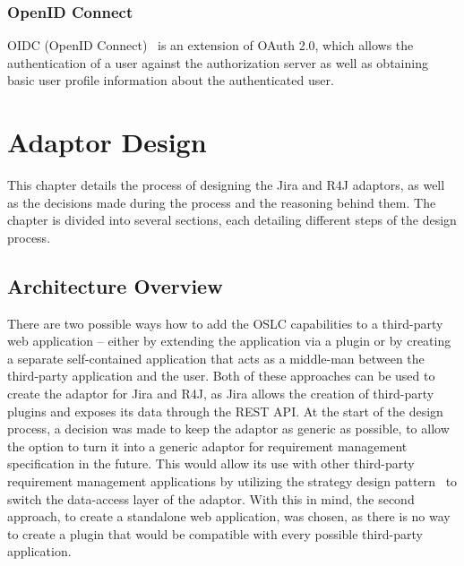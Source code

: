 \subsection*{OpenID Connect}
OIDC (OpenID Connect) \cite{oidc} is an extension of OAuth 2.0, which allows the authentication of a user against the authorization server as well as obtaining basic user profile information about the authenticated user.


\chapter{Adaptor Design}
This chapter details the process of designing the Jira and R4J adaptors, as well as the decisions made during the process and the reasoning behind them. The chapter is divided into several sections, each detailing different steps of the design process.

\section{Architecture Overview}
There are two possible ways how to add the OSLC capabilities to a third-party web application -- either by extending the application via a plugin or by creating a separate self-contained application that acts as a middle-man between the third-party application and the user. Both of these approaches can be used to create the adaptor for Jira and R4J, as Jira allows the creation of third-party plugins and exposes its data through the REST API. At the start of the design process, a decision was made to keep the adaptor as generic as possible, to allow the option to turn it into a generic adaptor for requirement management specification in the future. This would allow its use with other third-party requirement management applications by utilizing the strategy design pattern \cite{strategy_design_pattern} to switch the data-access layer of the adaptor. With this in mind, the second approach, to create a standalone web application, was chosen, as there is no way to create a plugin that would be compatible with every possible third-party application.

